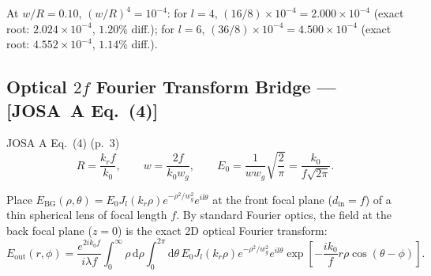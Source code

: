 \documentclass[10pt,letterpaper]{article}
\newcommand{\dd}{\mathrm{d}}
\newcommand{\josa}[1]{\textbf{[JOSA~A Eq.~(#1)]}}
\numberwithin{equation}{section}
\begin{document}
\begin{pencheck}[Hand Arithmetic at $w/R = 0.10$, $l = 4$ and $l = 6$]
At $w/R = 0.10$, $(w/R)^4 = 10^{-4}$: for $l = 4$, $(16/8)\times 10^{-4} = 2.000\times 10^{-4}$ (exact root: $2.024\times 10^{-4}$, $1.20\%$ diff.); for $l = 6$, $(36/8)\times 10^{-4} = 4.500\times 10^{-4}$ (exact root: $4.552\times 10^{-4}$, $1.14\%$ diff.).
\end{pencheck}

\subsection{Optical $2f$ Fourier Transform Bridge --- \josa{4}}
\label{sec:s2_2f}

\begin{targeteq}{JOSA A Eq.~(4) (p.~3)}
\[
  R = \frac{k_r f}{k_0}, \qquad w = \frac{2f}{k_0 w_g}, \qquad E_0 = \frac{1}{w w_g}\sqrt{\frac{2}{\pi}} = \frac{k_0}{f\sqrt{2\pi}}.
\]
\end{targeteq}

Place $E_{\mathrm{BG}}(\rho,\theta) = E_0 J_l(k_r\rho) e^{-\rho^2/w_g^2} e^{il\theta}$ at the front focal plane ($d_{\mathrm{in}} = f$) of a thin spherical lens of focal length $f$. By standard Fourier optics, the field at the back focal plane ($z = 0$) is the exact 2D optical Fourier transform:
\begin{equation}
  E_{\mathrm{out}}(r,\phi) = \frac{e^{2ik_0 f}}{i\lambda f}\int_0^\infty \rho\,\dd\rho \int_0^{2\pi} \dd\theta\, E_0 J_l(k_r\rho) e^{-\rho^2/w_g^2} e^{il\theta} \exp\!\left[-\frac{ik_0}{f} r\rho\cos(\theta-\phi)\right].
\end{equation}
\end{document}
